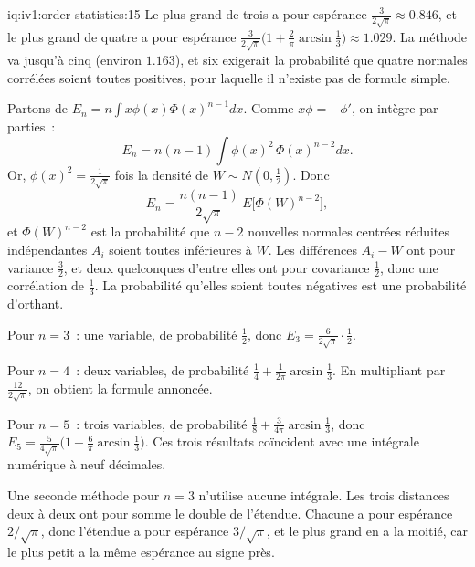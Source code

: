 \enlargethispage{-2\baselineskip}%
\begin{solution}{iq:iv1:order-statistics:15}
Le plus grand de trois a pour espérance $\frac{3}{2\sqrt{\pi}} \approx 0.846$, et le plus grand de quatre a pour espérance $\frac{3}{2\sqrt{\pi}}\bigl(1 + \frac{2}{\pi} \arcsin\frac13\bigr) \approx 1.029$. La méthode va jusqu'à cinq (environ $1.163$), et six exigerait la probabilité que quatre normales corrélées soient toutes positives, pour laquelle il n'existe pas de formule simple.

Partons de $E_n = n\int x\phi(x)\Phi(x)^{n - 1}dx$. Comme $x\phi = -\phi'$, on intègre par parties~:
\[
E_n = n(n - 1) \int \phi(x)^2\, \Phi(x)^{n - 2} dx.
\]
Or, $\phi(x)^2 = \frac{1}{2\sqrt{\pi}}$ fois la densité de $W \sim N(0, \tfrac12)$. Donc
\[
E_n = \frac{n(n - 1)}{2\sqrt{\pi}}\, E\bigl[\Phi(W)^{n - 2}\bigr],
\]
et $\Phi(W)^{n - 2}$ est la probabilité que $n - 2$ nouvelles normales centrées réduites indépendantes $A_i$ soient toutes inférieures à $W$. Les différences $A_i - W$ ont pour variance $\tfrac32$, et deux quelconques d'entre elles ont pour covariance $\tfrac12$, donc une corrélation de $\tfrac13$. La probabilité qu'elles soient toutes négatives est une probabilité d'orthant.

Pour $n = 3$~: une variable, de probabilité $\tfrac12$, donc $E_3 = \frac{6}{2\sqrt{\pi}} \cdot \tfrac12$.

Pour $n = 4$~: deux variables, de probabilité $\tfrac14 + \frac{1}{2\pi}\arcsin\frac13$. En multipliant par $\frac{12}{2\sqrt{\pi}}$, on obtient la formule annoncée.

Pour $n = 5$~: trois variables, de probabilité $\tfrac18 + \frac{3}{4\pi}\arcsin\frac13$, donc $E_5 = \frac{5}{4\sqrt{\pi}}\bigl(1 + \frac{6}{\pi}\arcsin\frac13\bigr)$. Ces trois résultats coïncident avec une intégrale numérique à neuf décimales.

Une seconde méthode pour $n = 3$ n'utilise aucune intégrale. Les trois distances deux à deux ont pour somme le double de l'étendue. Chacune a pour espérance $2/\sqrt{\pi}$, donc l'étendue a pour espérance $3/\sqrt{\pi}$, et le plus grand en a la moitié, car le plus petit a la même espérance au signe près.

\end{solution}
